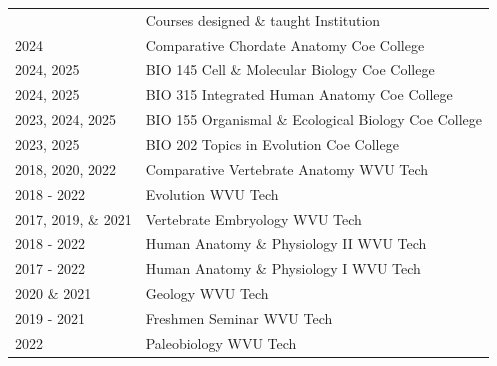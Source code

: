 \documentclass[a4paper, oneside, final]{scrartcl} %
\newcommand{\gray}{\rowcolor[gray]{.90}} %
\begin{document}
\begin{center}
\begin{tabularx}{0.97\linewidth}{>{\raggedleft\scshape}p{2cm}X}
  & Courses designed \& taught \hfill Institution \\
 \gray 2024 & Comparative Chordate Anatomy \hfill Coe College \\
 2024, 2025 & BIO 145 Cell \& Molecular Biology \hfill Coe College \\
  \gray 2024, 2025 & BIO 315 Integrated Human Anatomy \hfill Coe College \\
  2023, 2024, 2025 & BIO 155 Organismal \& Ecological Biology \hfill Coe College \\
  \gray 2023, 2025 & BIO 202 Topics in Evolution \hfill Coe College \\
 2018, 2020, 2022 & Comparative Vertebrate Anatomy \hfill WVU Tech \\
 \gray 2018 - 2022 & Evolution \hfill WVU Tech \\
 2017, 2019, \& 2021 & Vertebrate Embryology \hfill WVU Tech \\
 \gray 2018 - 2022 & Human Anatomy \& Physiology II \hfill WVU Tech \\
2017 - 2022 & Human Anatomy \& Physiology I \hfill WVU Tech \\
 \gray 2020 \& 2021 & Geology \hfill WVU Tech \\
2019 - 2021 & Freshmen Seminar \hfill WVU Tech \\
 \gray 2022 & Paleobiology \hfill WVU Tech \\
\hline
\end{tabularx}



\end{center}
\end{document}
